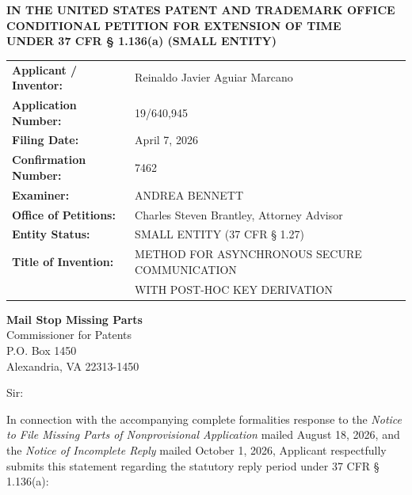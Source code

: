 \documentclass[11pt,letterpaper]{article}
\begin{document}
\thispagestyle{empty}

\begin{center}
    \textbf{\large IN THE UNITED STATES PATENT AND TRADEMARK OFFICE} \\
    \vspace{0.3cm}
    \textbf{\large CONDITIONAL PETITION FOR EXTENSION OF TIME} \\
    \textbf{\normalsize UNDER 37 CFR \S{} 1.136(a) (SMALL ENTITY)}
\end{center}

\vspace{0.4cm}
\noindent\begin{tabular}{p{2.3in}p{4.0in}}
\textbf{Applicant / Inventor:} & Reinaldo Javier Aguiar Marcano \\
\textbf{Application Number:} & 19/640,945 \\
\textbf{Filing Date:} & April 7, 2026 \\
\textbf{Confirmation Number:} & 7462 \\
\textbf{Examiner:} & ANDREA BENNETT \\
\textbf{Office of Petitions:} & Charles Steven Brantley, Attorney Advisor \\
\textbf{Entity Status:} & SMALL ENTITY (37 CFR \S{} 1.27) \\
\textbf{Title of Invention:} & METHOD FOR ASYNCHRONOUS SECURE COMMUNICATION \\
& WITH POST-HOC KEY DERIVATION \\
\end{tabular}

\vspace{0.5cm}
\noindent\textbf{Mail Stop Missing Parts} \\
Commissioner for Patents \\
P.O. Box 1450 \\
Alexandria, VA 22313-1450

\vspace{0.2cm}
Sir:

In connection with the accompanying complete formalities response to the \textit{Notice to File Missing Parts of Nonprovisional Application} mailed August 18, 2026, and the \textit{Notice of Incomplete Reply} mailed October 1, 2026, Applicant respectfully submits this statement regarding the statutory reply period under 37 CFR \S{} 1.136(a):
\end{document}
